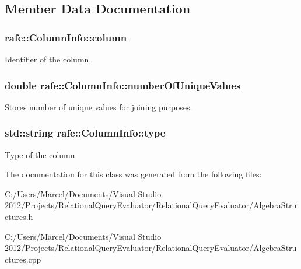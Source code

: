 \subsection{Member Data Documentation}
\hypertarget{classrafe_1_1_column_info_a446710a3a03b249da265a785aff1ee18}{
\subsubsection[{column}]{ rafe\+::\+Column\+Info\+::column}}\label{classrafe_1_1_column_info_a446710a3a03b249da265a785aff1ee18}
Identifier of the column. \hypertarget{classrafe_1_1_column_info_a3925986dda2c3385a512d6491e282aae}{
\subsubsection[{number\+Of\+Unique\+Values}]{\setlength{\rightskip}{0pt plus 5cm}double rafe\+::\+Column\+Info\+::number\+Of\+Unique\+Values}}\label{classrafe_1_1_column_info_a3925986dda2c3385a512d6491e282aae}
Stores number of unique values for joining purposes. \hypertarget{classrafe_1_1_column_info_a22fd355567e1d07f30fd1deae721577f}{
\subsubsection[{type}]{\setlength{\rightskip}{0pt plus 5cm}std\+::string rafe\+::\+Column\+Info\+::type}}\label{classrafe_1_1_column_info_a22fd355567e1d07f30fd1deae721577f}
Type of the column. 

The documentation for this class was generated from the following files\+:\begin{DoxyCompactItemize}
\item 
C\+:/\+Users/\+Marcel/\+Documents/\+Visual Studio 2012/\+Projects/\+Relational\+Query\+Evaluator/\+Relational\+Query\+Evaluator/Algebra\+Structures.\+h\item 
C\+:/\+Users/\+Marcel/\+Documents/\+Visual Studio 2012/\+Projects/\+Relational\+Query\+Evaluator/\+Relational\+Query\+Evaluator/Algebra\+Structures.\+cpp\end{DoxyCompactItemize}
